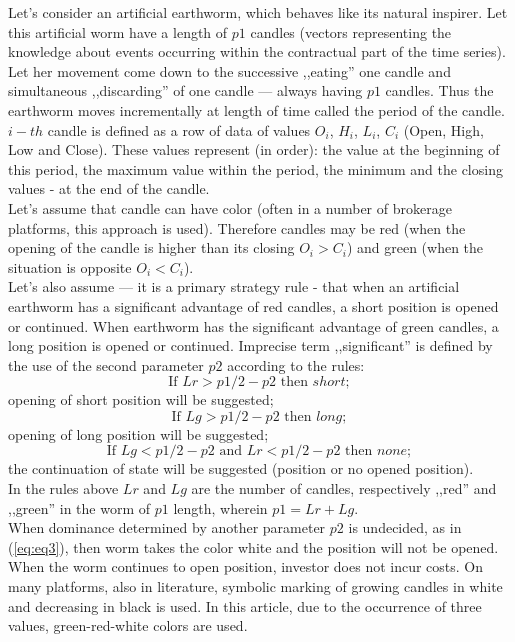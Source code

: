 \documentclass[runningheads,a4paper]{llncs}
\begin{document}
Let's consider an artificial earthworm, which behaves like its natural inspirer. Let this artificial worm have a length of $p1$ candles (vectors representing the knowledge about events occurring within the contractual part of the time series). Let her movement come down to the successive ,,eating'' one candle and simultaneous ,,discarding'' of one candle --- always having $p1$ candles. Thus the earthworm moves incrementally at length of time called the period of the candle. $i-th$ candle is  defined as a row of data of values  $O_i$, $H_i$, $L_i$, $C_i$ (Open, High, Low and Close). These values represent (in order): the value at the beginning of this period, the maximum value within the period, the minimum and the closing values - at the end of the candle.\\
Let's assume that candle can have color (often in a number of brokerage platforms, this approach is used). Therefore candles may be red (when the opening of the candle is higher than its closing $O_i>C_i$) and green (when the situation is opposite $O_i<C_i$).\\
Let's also assume --- it is a primary strategy rule - that when an artificial earthworm has a significant advantage of red candles, a short position is opened or continued. When earthworm has the significant advantage of green candles, a long position is opened or continued. Imprecise term ,,significant'' is defined by the use of the second parameter $p2$ according to the rules:
\begin{equation}
\text{If }  Lr > p1/2 -p2 \text{ then } short;
\end{equation}
opening of short position will be suggested;
\begin{equation}
\text{If }  Lg > p1/2 -p2 \text{ then } long;
\end{equation}
opening of long position will be suggested;
\begin{equation}
\text{If }  Lg < p1/2 -p2 \text{ and } Lr< p1/2-p2 \text{ then } none;
\label{eq:eq3}
\end{equation}
the continuation of state will be suggested (position or no opened position).\\

In the rules above $Lr$ and $Lg$ are the number of candles, respectively ,,red'' and ,,green'' in the worm of $p1$ length, wherein $p1 = Lr + Lg$.\\
When dominance determined by another parameter $p2$ is undecided, as in (\ref{eq:eq3}), then worm takes the color white and the position will not be opened. When the worm continues to open position, investor does not incur costs. On many platforms, also in literature, symbolic marking of growing candles in white and decreasing in black is used. In this article, due to the occurrence of three values, green-red-white colors are used.\\
\end{document}
